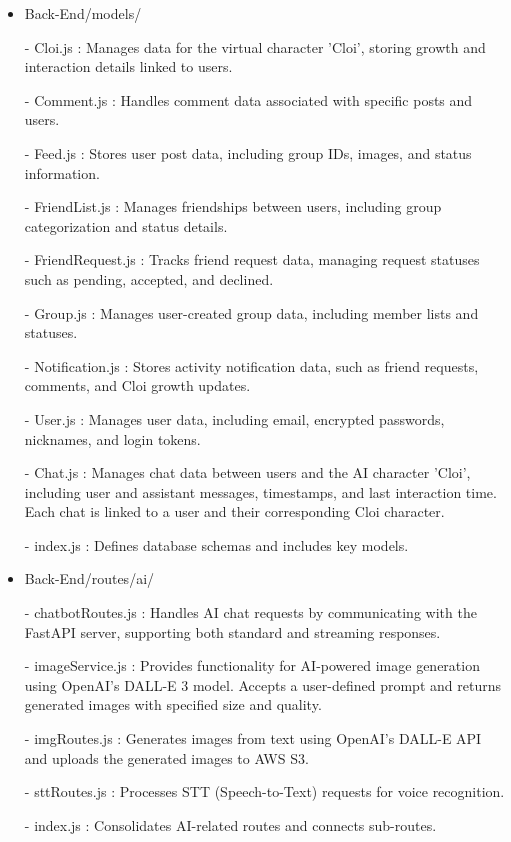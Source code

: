 \begin{itemize}
                    \item Back-End/models/
                        \item[-] Cloi.js : Manages data for the virtual character 'Cloi', storing growth and interaction details linked to users.
                        \item[-] Comment.js : Handles comment data associated with specific posts and users.
                        \item[-] Feed.js : Stores user post data, including group IDs, images, and status information.
                        \item[-] FriendList.js : Manages friendships between users, including group categorization and status details.
                        \item[-] FriendRequest.js : Tracks friend request data, managing request statuses such as pending, accepted, and declined.
                        \item[-] Group.js : Manages user-created group data, including member lists and statuses.
                        \item[-] Notification.js : Stores activity notification data, such as friend requests, comments, and Cloi growth updates.
                        \item[-] User.js : Manages user data, including email, encrypted passwords, nicknames, and login tokens.
                        \item[-] Chat.js : Manages chat data between users and the AI character 'Cloi', including user and assistant messages, timestamps, and last interaction time. Each chat is linked to a user and their corresponding Cloi character.

                        \item[-] index.js : Defines database schemas and includes key models.
                    \vspace{3mm}
                    
                    \item Back-End/routes/ai/
                        \item[-] chatbotRoutes.js : Handles AI chat requests by communicating with the FastAPI server, supporting both standard and streaming responses.
                        \item[-] imageService.js : Provides functionality for AI-powered image generation using OpenAI's DALL-E 3 model. Accepts a user-defined prompt and returns generated images with specified size and quality.
                        \item[-] imgRoutes.js : Generates images from text using OpenAI's DALL-E API and uploads the generated images to AWS S3.
                        \item[-] sttRoutes.js : Processes STT (Speech-to-Text) requests for voice recognition.
                        \item[-] index.js : Consolidates AI-related routes and connects sub-routes.
                    \vspace{3mm}
                    

\end{itemize}
